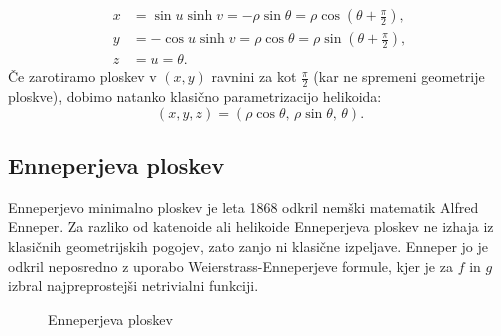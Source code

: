 \documentclass[fin1, tisk, bibtex]{fmfdelo}
\newcommand{\samplescalar}{50} %
\begin{document}
\begin{align*}
    x &= \sin u \sinh v = -\rho \sin \theta = \rho \cos\left(\theta + \frac{\pi}{2}\right), \\
    y &= -\cos u \sinh v = \rho \cos \theta = \rho \sin\left(\theta + \frac{\pi}{2}\right), \\
    z &= u = \theta.
\end{align*}
Če zarotiramo ploskev v $(x,y)$ ravnini za kot $\frac{\pi}{2}$ (kar ne spremeni geometrije ploskve), dobimo natanko klasično parametrizacijo helikoida:
\begin{equation*}
    (x, y, z) = (\rho \cos \theta, \, \rho \sin \theta, \, \theta).
\end{equation*}


\subsection{Enneperjeva ploskev}

Enneperjevo minimalno ploskev je leta 1868 odkril nemški matematik Alfred Enneper. Za razliko od katenoide ali helikoide Enneperjeva ploskev ne izhaja iz klasičnih geometrijskih pogojev, zato zanjo ni klasične izpeljave. Enneper jo je odkril neposredno z uporabo Weierstrass-Enneperjeve formule, kjer je za $f$ in $g$ izbral najpreprostejši netrivialni funkciji.

\begin{figure}[ht]
    \centering
    \caption{Enneperjeva ploskev}
\end{figure}
\end{document}
